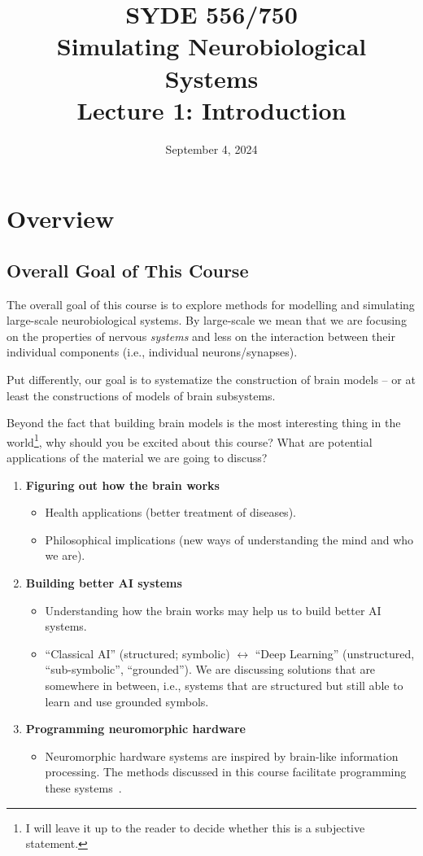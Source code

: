 \documentclass[10pt,letterpaper,oneside]{article}
\date{September 4, 2024}
\title{SYDE 556/750 \\ Simulating Neurobiological Systems \\ Lecture 1: Introduction}
\begin{document}

\section{Overview}


\subsection{Overall Goal of This Course}

The overall goal of this course is to explore methods for modelling and simulating large-scale neurobiological systems. By large-scale we mean that we are focusing on the properties of nervous \emph{systems} and less on the interaction between their individual components (i.e., individual neurons/synapses).

Put differently, our goal is to systematize the construction of brain models -- or at least the constructions of models of brain subsystems.

Beyond the fact that building brain models is the most interesting thing in the world\footnote{I will leave it up to the reader to decide whether this is a subjective statement.}, why should you be excited about this course? What are potential applications of the material we are going to discuss?
\begin{enumerate}[1.]
	\item \textbf{Figuring out how the brain works}
	\begin{itemize}
		\item Health applications (better treatment of diseases).
		\item Philosophical implications (new ways of understanding the mind and who we are).
	\end{itemize}
	\item \textbf{Building better AI systems}
	\begin{itemize}
		\item Understanding how the brain works may help us to build better AI systems.
		\item \enquote{Classical AI} (structured; symbolic) $\leftrightarrow$ \enquote{Deep Learning} (unstructured, \enquote{sub-symbolic}, \enquote{grounded}). We are discussing solutions that are somewhere in between, i.e., systems that are structured but still able to learn and use grounded symbols.
	\end{itemize}
	\item \textbf{Programming neuromorphic hardware}
	\begin{itemize}
		\item Neuromorphic hardware systems are inspired by brain-like information processing. The methods discussed in this course facilitate programming these systems~\cite{boahen2017neuromorph}.
	\end{itemize}
\end{enumerate}
\end{document}
